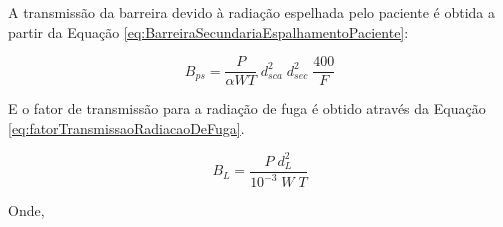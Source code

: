 \documentclass[11pt,a4paper]{article}
\begin{document}
            A transmissão da barreira devido à radiação espelhada pelo paciente é obtida a partir da Equação \ref{eq:BarreiraSecundariaEspalhamentoPaciente}: 

            \begin{equation}
                B_{ps} = \frac{P}{\alpha W T} \; d_{sca}^2 \; d_{sec}^2 \; \frac{400}{F}
                \label{eq:BarreiraSecundariaEspalhamentoPaciente}
            \end{equation}

            E o fator de transmissão para a radiação de fuga é obtido através da Equação \ref{eq:fatorTransmissaoRadiacaoDeFuga}.

                \begin{equation}
                    B_L = \frac{P \; d_L^2}{10^{-3} \; W \; T}
                    \label{eq:fatorTransmissaoRadiacaoDeFuga}
                \end{equation}

            Onde, 
\end{document}
